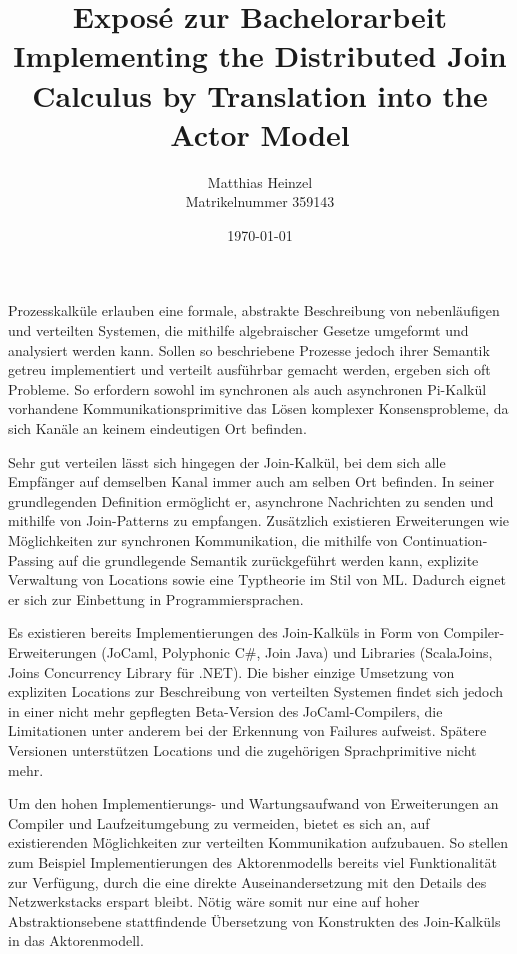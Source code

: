 \documentclass[12pt]{article}
\title{{\large Expos\'e zur Bachelorarbeit}
\\ Implementing the Distributed Join Calculus by Translation into the Actor Model
%
}
\author{Matthias Heinzel\\Matrikelnummer 359143}
\date{\today}
\begin{document}
\maketitle

Prozesskalküle erlauben eine formale, abstrakte Beschreibung von nebenläufigen und verteilten Systemen, die mithilfe algebraischer Gesetze umgeformt und analysiert werden kann.
Sollen so beschriebene Prozesse jedoch ihrer Semantik getreu implementiert und verteilt ausführbar gemacht werden, ergeben sich oft Probleme.
So erfordern sowohl im synchronen als auch asynchronen Pi-Kalkül vorhandene Kommunikationsprimitive das Lösen komplexer Konsensprobleme, da sich Kanäle an keinem eindeutigen Ort befinden.

Sehr gut verteilen lässt sich hingegen der Join-Kalkül, bei dem sich alle Empfänger auf demselben Kanal immer auch am selben Ort befinden\cite{fournet_reflexive_1996}.
In seiner grundlegenden Definition ermöglicht er, asynchrone Nachrichten zu senden und mithilfe von Join-Patterns zu empfangen.
Zusätzlich existieren Erweiterungen wie Möglichkeiten zur synchronen Kommunikation, die mithilfe von Continuation-Passing auf die grundlegende Semantik zurückgeführt werden kann, explizite Verwaltung von Locations\cite{fournet_calculus_1996} sowie eine Typtheorie im Stil von ML\cite{fournet_implicit_1997}. Dadurch eignet er sich zur Einbettung in Programmiersprachen.

Es existieren bereits Implementierungen des Join-Kalküls in Form von Compiler-Erweiterungen (JoCaml\cite{mandel_programming_2007}, Polyphonic C\#\cite{benton_modern_2002}, Join Java\cite{itzstein_implementing_2003}) und Libraries (ScalaJoins\cite{haller_implementing_2008}, Joins Concurrency Library für .NET\cite{russo_joins_2007}).
Die bisher einzige Umsetzung von expliziten Locations zur Beschreibung von verteilten Systemen findet sich jedoch in einer nicht mehr gepflegten Beta-Version des JoCaml-Compilers, die Limitationen unter anderem bei der Erkennung von Failures aufweist\cite{conchon_jocaml:_1999}.
Spätere Versionen unterstützen Locations und die zugehörigen Sprachprimitive nicht mehr.

Um den hohen Implementierungs- und Wartungsaufwand von Erweiterungen an Compiler und Laufzeitumgebung zu vermeiden, bietet es sich an, auf existierenden Möglichkeiten zur verteilten Kommunikation aufzubauen.
So stellen zum Beispiel Implementierungen des Aktorenmodells bereits viel Funktionalität zur Verfügung, durch die eine direkte Auseinandersetzung mit den Details des Netzwerkstacks erspart bleibt.
Nötig wäre somit nur eine auf hoher Abstraktionsebene stattfindende Übersetzung von Konstrukten des Join-Kalküls in das Aktorenmodell.
\end{document}
